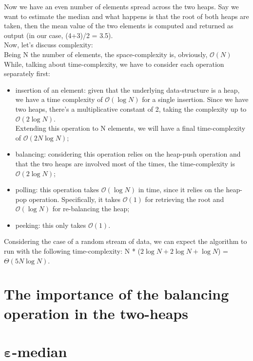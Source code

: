\documentclass[paper=a4wide, fontsize=12pt]{scrartcl}	 %
\begin{document}
Now we have an even number of elements spread across the two heaps. Say we want to estimate the median and what happens is that the root of both heaps are taken, then the mean value of the two elements is computed and returned as output (in our case, (4+3)/2 = 3.5).
\\
Now, let's discuss complexity:\\
Being N the number of elements, the space-complexity is, obviously, $\mathcal{O}(N)$ 
While, talking about time-complexity, we have to consider each operation separately first:
\begin{itemize}
    \item insertion of an element: given that the underlying data-structure is a heap, we have a time complexity of $\mathcal{O}(\log N)$ for a single insertion. Since we have two heaps, there's a multiplicative constant of 2, taking the complexity up to $\mathcal{O}(2\log N)$.\\
    Extending this operation to N elements, we will have a final time-complexity of $\mathcal{O}(2N\log N)$;
    \item balancing: considering this operation relies on the heap-push operation and that the two heaps are involved most of the times, the time-complexity is $\mathcal{O}(2\log N)$;
    \item polling: this operation takes $\mathcal{O}(\log N)$ in time, since it relies on the heap-pop operation. Specifically, it takes $\mathcal{O}(1)$ for retrieving the root and $\mathcal{O}(\log N)$ for re-balancing the heap;
    \item peeking: this only takes $\mathcal{O}(1)$.
\end{itemize}
Considering the case of a random stream of data, we can expect the algorithm to run with the following time-complexity: N * ($2\log N + 2\log N + \log N$) = $\Theta(5N\log N)$.


\section*{The importance of the balancing operation in the two-heaps}


\section*{$\mathbf{\varepsilon}$-median}
\end{document}
